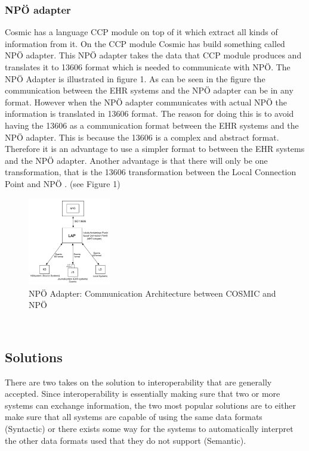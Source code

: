 \documentclass[14pt]{article}
\begin{document}
\subsubsection{NPÖ adapter}
Cosmic has a language CCP module on top of it which extract all kinds of information from it. On the CCP module Cosmic has build something called NPÖ adapter. This NPÖ adapter takes the data that CCP module produces and translates it to 13606 format which is needed to communicate with NPÖ. The NPÖ Adapter is illustrated in figure 1. As can be seen in the figure the communication between the \gls{EHR} systems and the NPÖ adapter can be in any format. However when the NPÖ adapter communicates with actual NPÖ the information is translated in 13606 format. The reason for doing this is to avoid having the 13606 as a communication format between the \gls{EHR} systems and the NPÖ adapter. This is because the 13606 is a complex and abstract format. Therefore it is an advantage to use a simpler format to between the \gls{EHR} systems and the NPÖ adapter. Another advantage is that there will only be one transformation, that is the 13606 transformation between the Local Connection Point and NPÖ  \cite{ViktorJernelov}. (see Figure 1) 

\begin{figure}[h!]
  \caption{NPÖ Adapter: Communication Architecture between COSMIC and NPÖ}
  \centering
    \includegraphics[width=0.32\textwidth]{Images/npoAdapt}
\end{figure}\

\subsection{Solutions}
There are two takes on the solution to interoperability that are generally accepted.  Since interoperability is essentially making sure that two or more systems can exchange information, the two most popular solutions are to either make sure that all systems are capable of using the same data formats (Syntactic) or there exists some way for the systems to automatically interpret the other data formats used that they do not support (Semantic).
\end{document}
